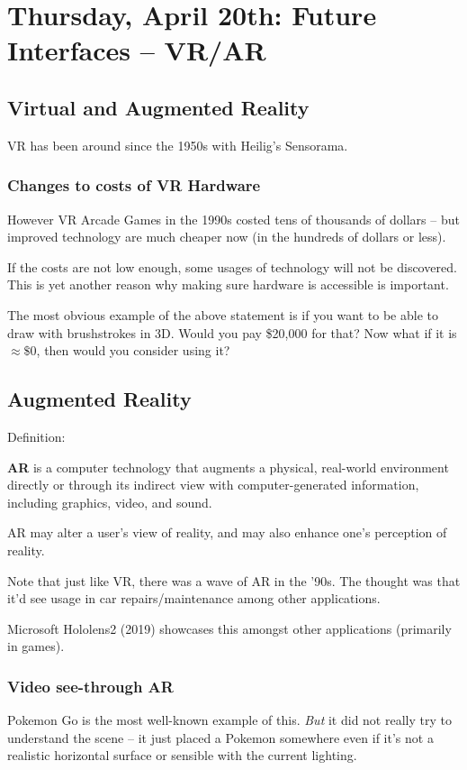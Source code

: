 \section{Thursday, April 20th: Future Interfaces -- VR/AR}
\subsection{Virtual and Augmented Reality}
VR has been around since the 1950s with Heilig's Sensorama.

\subsubsection{Changes to costs of VR Hardware}
However VR Arcade Games in the 1990s costed tens of thousands of dollars -- but improved technology are much cheaper now (in the hundreds of dollars or less).

\begin{important}
If the costs are not low enough, some usages of technology will not be discovered. This is yet another reason why making sure hardware is accessible is important.
\end{important}
The most obvious example of the above statement is if you want to be able to draw with brushstrokes in 3D. Would you pay \$20,000 for that? Now what if it is $\approx\$0$, then would you consider using it?

\subsection{Augmented Reality}
Definition:
\begin{shaded}
\textbf{AR} is a computer technology that augments a physical, real-world environment directly or through its indirect view with computer-generated information, including graphics, video, and sound.

AR may alter a user’s view of reality, and may also enhance one’s perception of reality.
\end{shaded}

Note that just like VR, there was a wave of AR in the '90s. The thought was that it'd see usage in car repairs/maintenance among other applications.

Microsoft Hololens2 (2019) showcases this amongst other applications (primarily in games).

\subsubsection{Video see-through AR}
Pokemon Go is the most well-known example of this. \textit{But} it did not really try to understand the scene -- it just placed a Pokemon somewhere even if it's not a realistic horizontal surface or sensible with the current lighting.

